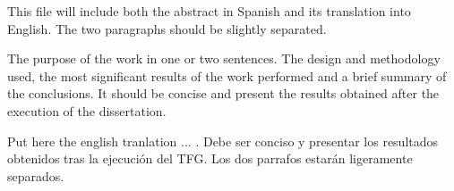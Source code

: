 This file will include both the abstract in Spanish and its translation into English. The two paragraphs should be slightly separated.

The purpose of the work in one or two sentences.  The design and methodology used, the most significant results of the work performed and a brief summary of the conclusions. It should be concise and present the results obtained after the execution of the dissertation. 


\vspace{1.5cm}

Put here  the english tranlation  ... . Debe ser conciso y presentar los resultados obtenidos tras la ejecución del TFG. Los dos parrafos estarán ligeramente separados.